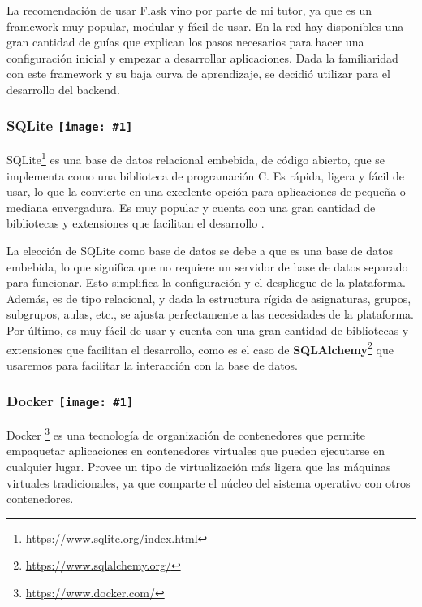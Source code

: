 La recomendación de usar Flask vino por parte de mi tutor, ya que es un framework muy popular, modular y fácil de usar. En la red hay disponibles una gran cantidad de guías que explican los pasos necesarios para hacer una configuración inicial y empezar a desarrollar aplicaciones. Dada la familiaridad con este framework y su baja curva de aprendizaje, se decidió utilizar para el desarrollo del backend.

\renewcommand{\icon}[1]{\texttt{[image: \#1]}}
\subsubsection*{SQLite \protect\icon{./imagenes/sqlite_logo.png}}

SQLite\footnote{\url{https://www.sqlite.org/index.html}} es una base de datos relacional embebida, de código abierto, que se implementa como una biblioteca de programación C. Es rápida, ligera y fácil de usar, lo que la convierte en una excelente opción para aplicaciones de pequeña o mediana envergadura. Es muy popular y cuenta con una gran cantidad de bibliotecas y extensiones que facilitan el desarrollo \cite{kreibich2010using}.\newline

La elección de SQLite como base de datos se debe a que es una base de datos embebida, lo que significa que no requiere un servidor de base de datos separado para funcionar. Esto simplifica la configuración y el despliegue de la plataforma. Además, es de tipo relacional, y dada la estructura rígida de asignaturas, grupos, subgrupos, aulas, etc., se ajusta perfectamente a las necesidades de la plataforma. Por último, es muy fácil de usar y cuenta con una gran cantidad de bibliotecas y extensiones que facilitan el desarrollo, como es el caso de \textbf{SQLAlchemy}\footnote{\url{https://www.sqlalchemy.org/}} que usaremos para facilitar la interacción con la base de datos.

\renewcommand{\icon}[1]{\texttt{[image: \#1]}}
\subsubsection*{Docker \protect\icon{./imagenes/docker_logo.png}}

Docker \footnote{\url{https://www.docker.com/}} es una tecnología de organización de contenedores que permite empaquetar aplicaciones en contenedores virtuales que pueden ejecutarse en cualquier lugar. Provee un tipo de virtualización más ligera que las máquinas virtuales tradicionales, ya que comparte el núcleo del sistema operativo con otros contenedores.\newline

